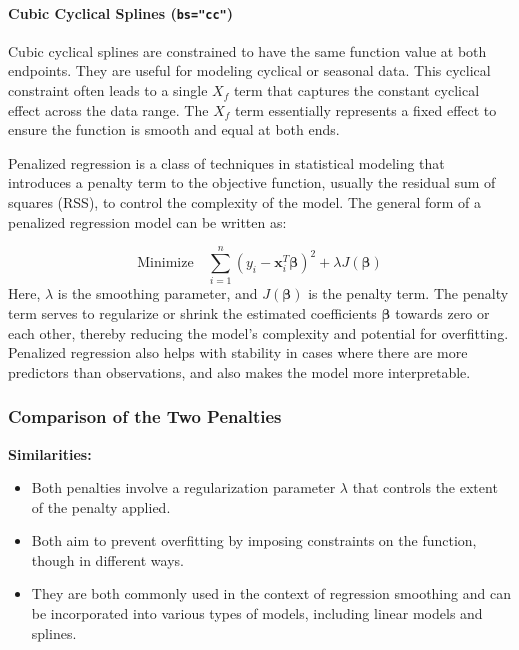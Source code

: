 \paragraph{Cubic Cyclical Splines (\texttt{bs="cc"})}

Cubic cyclical splines are constrained to have the same function value at both endpoints. They are useful for modeling cyclical or seasonal data. This cyclical constraint often leads to a single \(X_f\) term that captures the constant cyclical effect across the data range. The \(X_f\) term essentially represents a fixed effect to ensure the function is smooth and equal at both ends.










Penalized regression is a class of techniques in statistical modeling that introduces a penalty term to the objective function, usually the residual sum of squares (RSS), to control the complexity of the model. The general form of a penalized regression model can be written as:

\begin{equation}
\text{Minimize} \quad \sum_{i=1}^{n} (y_i - \mathbf{x}_i^T \boldsymbol{\beta})^2 + \lambda J(\boldsymbol{\beta})
\end{equation}
 \cite{wood2017}
 \newline
Here, \( \lambda \) is the smoothing parameter, and \( J(\boldsymbol{\beta}) \) is the penalty term. The penalty term serves to regularize or shrink the estimated coefficients \( \boldsymbol{\beta} \) towards zero or each other, thereby reducing the model's complexity and potential for overfitting.
Penalized regression also helps with stability in cases where there are more predictors than observations, and also makes the model more interpretable.





\subsubsection*{Comparison of the Two Penalties}

\textbf{Similarities:}
\begin{itemize}
    \item Both penalties involve a regularization parameter \( \lambda \) that controls the extent of the penalty applied.
    \item Both aim to prevent overfitting by imposing constraints on the function, though in different ways.
    \item They are both commonly used in the context of regression smoothing and can be incorporated into various types of models, including linear models and splines.
\end{itemize}

